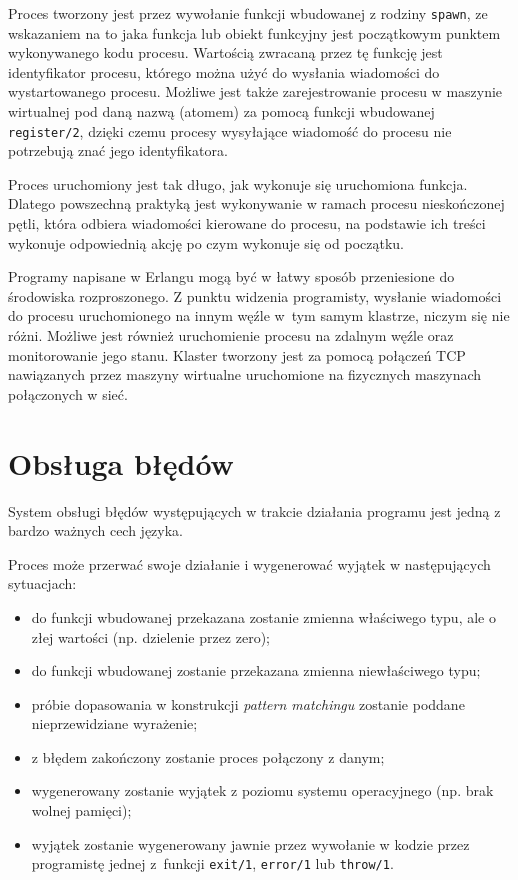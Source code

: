 Proces tworzony jest przez wywołanie funkcji wbudowanej z rodziny \texttt{spawn}, ze wskazaniem na to jaka funkcja lub obiekt funkcyjny jest początkowym punktem wykonywanego kodu procesu.
Wartością zwracaną przez tę funkcję jest identyfikator procesu, którego można użyć do wysłania wiadomości do wystartowanego procesu.
Możliwe jest także zarejestrowanie procesu w maszynie wirtualnej pod daną nazwą (atomem) za pomocą funkcji wbudowanej \texttt{register/2}, dzięki czemu procesy wysyłające wiadomość do procesu nie potrzebują znać jego identyfikatora.

Proces uruchomiony jest tak długo, jak wykonuje się uruchomiona funkcja. Dlatego powszechną praktyką jest wykonywanie w ramach procesu nieskończonej pętli, która odbiera wiadomości kierowane do procesu, na podstawie ich treści wykonuje odpowiednią akcję po czym wykonuje się od początku.

Programy napisane w Erlangu mogą być w łatwy sposób przeniesione do środowiska rozproszonego.
Z punktu widzenia programisty, wysłanie wiadomości do procesu uruchomionego na innym węźle w~tym samym klastrze, niczym się nie różni.
Możliwe jest również uruchomienie procesu na zdalnym węźle oraz monitorowanie jego stanu.
Klaster tworzony jest za pomocą połączeń TCP nawiązanych przez maszyny wirtualne uruchomione na fizycznych maszynach połączonych w sieć.

\section{Obsługa błędów}
\label{sec:erlangBledy}

System obsługi błędów występujących w trakcie działania programu jest jedną z bardzo ważnych cech języka. 

Proces może przerwać swoje działanie i wygenerować wyjątek w następujących sytuacjach:
\begin{itemize}
\item do funkcji wbudowanej przekazana zostanie zmienna właściwego typu, ale o złej wartości (np. dzielenie przez zero);
\item do funkcji wbudowanej zostanie przekazana zmienna niewłaściwego typu;
\item próbie dopasowania w konstrukcji \emph{pattern matchingu} zostanie poddane nieprzewidziane wyrażenie;
\item z błędem zakończony zostanie proces połączony z danym;
\item wygenerowany zostanie wyjątek z poziomu systemu operacyjnego (np. brak wolnej pamięci);
\item wyjątek zostanie wygenerowany jawnie przez wywołanie w kodzie przez programistę jednej z~funkcji \texttt{exit/1}, \texttt{error/1} lub \texttt{throw/1}.
\end{itemize}

